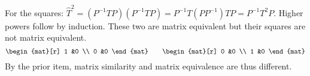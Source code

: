 \begin{exercises}
\begin{answer}
\begin{exparts}
          For the squares:
          \( \hat{T}^2=(P^{-1}TP)(P^{-1}TP)
                      =P^{-1}T(PP^{-1})TP=P^{-1}T^2P \).
          Higher powers follow by induction.
        \partsitem These two are matrix equivalent but their squares are not
          matrix equivalent.
          \begin{equation*}
             \begin{mat}[r]
               1  &0  \\
               0  &0
             \end{mat}
             \qquad
             \begin{mat}[r]
               0  &0  \\
               1  &0
             \end{mat}
          \end{equation*}
          By the prior item, matrix similarity and matrix equivalence are thus
          different.
      \end{exparts}  
   \end{answer}
\end{exercises}
